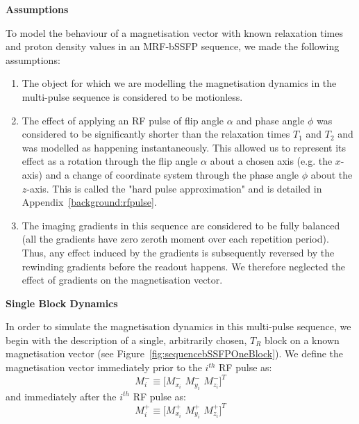 \hfill

\large \textbf{Assumptions} \normalsize

To model the behaviour of a magnetisation vector with known relaxation times and proton density values in an MRF-bSSFP sequence, we made the following assumptions:

\begin{enumerate}
    \item The object for which we are modelling the magnetisation dynamics in the multi-pulse sequence is considered to be motionless.

    \item The effect of applying an RF pulse of flip angle $\alpha$ and phase angle $\phi$ was considered to be significantly shorter than the relaxation times $T_1$ and $T_2$ and was modelled as happening instantaneously.
    This allowed us to represent its effect as a rotation through the flip angle $\alpha$ about a chosen axis (e.g. the $x$-axis) and a change of coordinate system through the phase angle $\phi$ about the $z$-axis.
    This is called the "hard pulse approximation" and is detailed in Appendix~\ref{background:rfpulse}.
    
    \item The imaging gradients in this sequence are considered to be fully balanced (all the gradients have zero zeroth moment over each repetition period).
    Thus, any effect induced by the gradients is subsequently reversed by the rewinding gradients before the readout happens.
    We therefore neglected the effect of gradients on the magnetisation vector.

\end{enumerate}

\hfill

\large \textbf{Single Block Dynamics} \normalsize

In order to simulate the magnetisation dynamics in this multi-pulse sequence, 
we begin with the description of a single, arbitrarily chosen, $T_R$ block on a known magnetisation vector (see Figure~\ref{fig:sequencebSSFPOneBlock}).
We define the magnetisation vector immediately prior to the $i^{th}$ RF pulse as:
\begin{equation}
    M^{-}_i \equiv \big[ M^-_{x_i} \, \,  M^-_{y_i} \, \, M^-_{z_i} \big]^T
\end{equation}
and immediately after the $i^{th}$ RF pulse as:
\begin{equation}
    M^{+}_i \equiv \big[ M^+_{x_i} \, \,  M^+_{y_i} \, \, M^+_{z_i} \big]^T
\end{equation}

